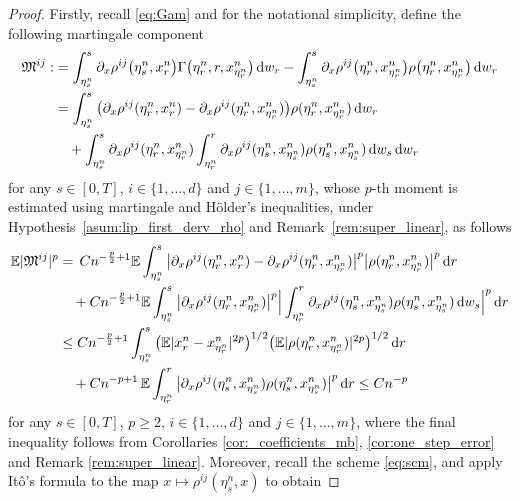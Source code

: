 \documentclass[reqno,  oneside, 12pt]{amsart}
\newcommand{\E}{\mathbb E}
\begin{document}
\begin{proof}
	Firstly, recall \eqref{eq:Gam} and for the notational simplicity, define the following martingale component
	\begin{align}
		\mathfrak M ^{ij}:&=\int_{\eta^n_s}^s \partial_x \rho^{ij}\big(\eta^n_s, x_{r}^{n}\big){\Gamma}\big(\eta^n_r,r,x_{\eta^n_r}^{n}\big) \, \mathrm{d}w_r- \int_{\eta^n_s}^s \partial_x \rho^{ij}\big(\eta^n_r, x_{\eta^n_r}^{n}\big){\rho}\big(\eta^n_r,x_{\eta^n_r}^{n}\big) \, \mathrm{d}w_r  \notag
		\\
		&=\int_{\eta^n_s}^s\big( \partial_x \rho^{ij}(\eta^n_r, x_{r}^{n})-\partial_x \rho^{ij}(\eta^n_r, x_{\eta^n_r}^{n})\big){\rho}(\eta^n_r,x_{\eta^n_r}^{n}) \, \mathrm{d}w_r \notag
		\\
		&\quad+ \int_{\eta^n_s}^s \partial_x \rho^{ij}(\eta^n_r, x_{\eta^n_r}^{n})\int_{\eta^n_r}^r\partial_x{\rho}^{ij}(\eta^n_s,x_{\eta^n_s}^{n}){\rho}(\eta^n_s,x_{\eta^n_s}^{n}) \, \mathrm{d}w_s\,   \mathrm{d}w_r \label{eq:martingale_term}
	\end{align}
	for any $s\in[0,T]$, $i\in\{1,\ldots,d\}$ and $j\in\{1,\ldots,m\}$, whose 
	$p$-th moment  is estimated using martingale   and H\"older's  inequalities, under Hypothesis~\ref{asum:lip_first_derv_rho} and    Remark~\ref{rem:super_linear}, as follows
	\begin{align} \label{eq:estimate_martingale_term}
		\E|\mathfrak M^{ij}|^p&=\,Cn^{-\frac{p}{2}+1}\E\int_{\eta^n_s}^s\big|\partial_x \rho^{ij}(\eta^n_r, x_{r}^{n})-\partial_x \rho^{ij}(\eta^n_r, x_{\eta^n_r}^{n})\big|^p\big|{\rho}(\eta^n_r,x_{\eta^n_r}^{n})\big|^p \, \mathrm{d}r \notag
		\\
		&\quad+
		Cn^{-\frac{p}{2}+1}\E\int_{\eta^n_s}^s\big|\partial_x{\rho}^{ij}(\eta^n_r,x_{\eta^n_r}^{n})\big|^p\Big|\int_{\eta^n_r}^r\partial_x{\rho}^{ij}(\eta^n_s,x_{\eta^n_s}^{n}){\rho}(\eta^n_s,x_{\eta^n_s}^{n}) \, \mathrm{d}w_s\Big|^p \, \mathrm{d}r \notag
		\\
		&\leq Cn^{-\frac{p}{2}+1}\int_{\eta^n_s}^s\big(\E| x_{r}^{n}- x_{\eta^n_r}^{n}|^{2p}\big)^{1/2}\big(\E|{\rho}(\eta^n_r,x_{\eta^n_r}^{n})|^{2p}\big)^{1/2} \, \mathrm{d}r  \notag
		\\
		&\quad+	Cn^{-p+1}\,\E\int_{\eta^n_r}^r\big|\partial_x{\rho}^{ij}(\eta^n_s,x_{\eta^n_s}^{n}){\rho}(\eta^n_s,x_{\eta^n_s}^{n})\big|^p \, \mathrm{d}r \leq
		Cn^{-p}
	\end{align}
	for any $s\in[0,T]$, $p\geq 2$, $i\in\{1,\ldots,d\}$ and $j\in\{1,\ldots,m\}$, where the final inequality follows from  Corollaries   \ref{cor:_coefficients_mb}, \ref{cor:one_step_error} and Remark   \ref{rem:super_linear}. Moreover, recall the scheme \eqref{eq:scm}, and apply It\^o’s formula \cite[Theorem 94]{Situ2006} to the map \( x \mapsto \rho^{ij}(\eta^n_s, x) \) to obtain

\end{proof}
\end{document}
